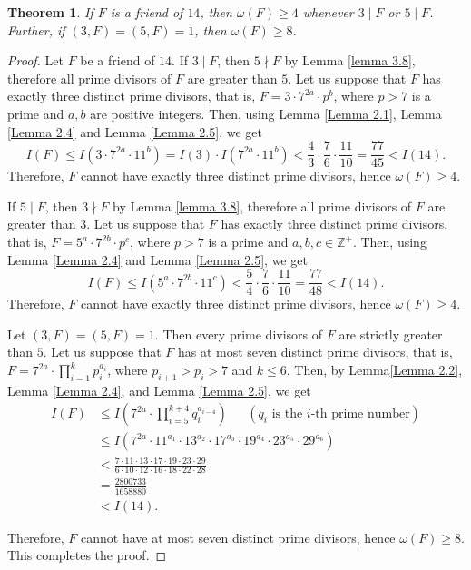 \documentclass[11pt,twoside]{amsart}
\newtheorem{theorem}{Theorem}[section]
\begin{document}
\begin{theorem}
 If $F$ is a friend of $14$, then $\omega(F)\geq 4$ whenever $3\mid F$ or $5\mid F$. Further, if $(3,F)=(5,F)=1$, then  $\omega(F)\geq 8$.   
\end{theorem}
\begin{proof}
Let $F$ be a friend of $14$. If $3\mid F$, then $5\nmid F$ by Lemma \ref{lemma 3.8}, therefore all prime divisors of $F$ are greater than $5$. Let us suppose that $F$ has exactly three distinct prime divisors, that is, $F=3\cdot 7^{2a}\cdot p^{b}$, where $p>7$ is a prime and $a,b$ are positive integers. Then, using Lemma \ref{Lemma 2.1}, Lemma \ref{Lemma 2.4} and Lemma \ref{Lemma 2.5}, we get 
$$I(F)\leq I(3\cdot 7^{2a}\cdot 11^{b})=I(3)\cdot I(7^{2a}\cdot 11^{b})<\frac{4}{3}\cdot \frac{7}{6}\cdot\frac{11}{10}=\frac{77}{45}<I(14).$$
Therefore, $F$ cannot have exactly three distinct prime divisors, hence $\omega(F)\geq 4$. 


If $5\mid F$, then $3\nmid F$ by Lemma \ref{lemma 3.8}, therefore all prime divisors of $F$ are greater than $3$. Let us suppose that $F$ has exactly three distinct prime divisors, that is, $F=5^{a}\cdot 7^{2b}\cdot p^{c}$, where $p>7$ is a prime and $a,b,c\in\mathbb{Z^+}$. Then, using Lemma \ref{Lemma 2.4} and Lemma \ref{Lemma 2.5}, we get 
$$I(F)\leq I(5^a\cdot 7^{2b}\cdot 11^{c})<\frac{5}{4}\cdot \frac{7}{6}\cdot\frac{11}{10}=\frac{77}{48}<I(14).$$
Therefore, $F$ cannot have exactly three distinct prime divisors, hence $\omega(F)\geq 4$. 


Let  $(3,F)=(5,F)=1$. Then every prime divisors of $F$ are strictly greater than $5$. Let us suppose that $F$ has at most seven distinct prime divisors, that is, $F=\displaystyle{7^{2a}\cdot\prod_{i=1}^{k}p_i^{a_i}}$, where $p_{i+1}>p_i>7$ and $k\leq 6$. Then, by Lemma\ref{Lemma 2.2}, Lemma \ref{Lemma 2.4}, and Lemma \ref{Lemma 2.5}, we get
\begin{align*}
I(F)&\leq I(7^{2a}\cdot \prod_{i=5}^{k+4}q_i^{a_{i-4}})~~~~~~~(q_i \text{ is the $i$-th prime number})\\
&\leq  I(7^{2a}\cdot 11^{a_1}\cdot 13^{a_2}\cdot 17^{a_3}\cdot 19^{a_4}\cdot 23^{a_5}\cdot 29^{a_6})\\[2mm]
&<\frac{7\cdot11\cdot13\cdot17\cdot19\cdot23\cdot29}{6\cdot10\cdot12\cdot16\cdot18\cdot22\cdot28}\\[2mm]
& =\frac{2800733}{1658880} \\
& <I(14).    
\end{align*}

Therefore, $F$ cannot have at most seven distinct prime divisors, hence $\omega(F)\geq 8$. This completes the proof.
\end{proof}
\end{document}
